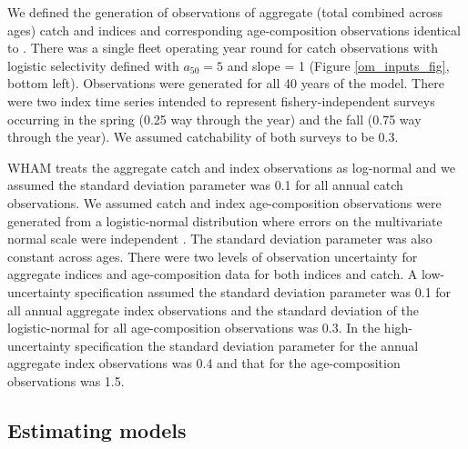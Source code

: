 \documentclass[
  12pt,
]{article}
\begin{document}
We defined the generation of observations of aggregate (total combined
across ages) catch and indices and corresponding age-composition
observations identical to \citet{milleretal26}. There was a single fleet
operating year round for catch observations with logistic selectivity
defined with \(a_{50} = 5\) and slope = 1 (Figure \ref{om_inputs_fig},
bottom left). Observations were generated for all 40 years of the model.
There were two index time series intended to represent
fishery-independent surveys occurring in the spring (0.25 way through
the year) and the fall (0.75 way through the year). We assumed
catchability of both surveys to be 0.3.

WHAM treats the aggregate catch and index observations as log-normal and
we assumed the standard deviation parameter was 0.1 for all annual catch
observations. We assumed catch and index age-composition observations
were generated from a logistic-normal distribution where errors on the
multivariate normal scale were independent
\citep{aitchisonshen80, stockmiller21, trijouletetal23}. The standard
deviation parameter was also constant across ages. There were two levels
of observation uncertainty for aggregate indices and age-composition
data for both indices and catch. A low-uncertainty specification assumed
the standard deviation parameter was 0.1 for all annual aggregate index
observations and the standard deviation of the logistic-normal for all
age-composition observations was 0.3. In the high-uncertainty
specification the standard deviation parameter for the annual aggregate
index observations was 0.4 and that for the age-composition observations
was 1.5.

\subsection*{Estimating models}\label{estimating-models}
\end{document}

